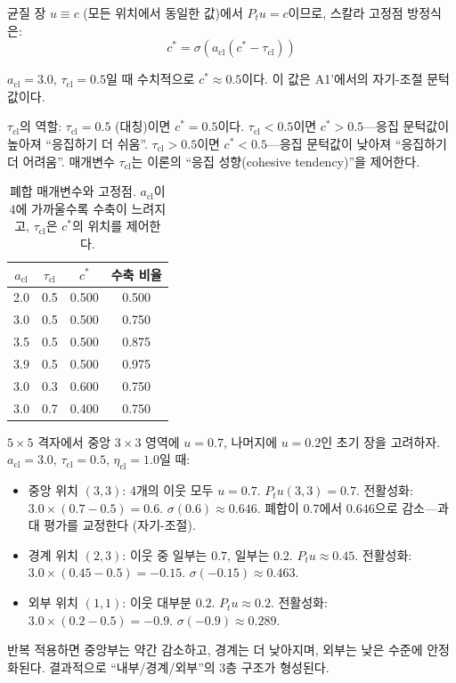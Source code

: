 균질 장 $u \equiv c$ (모든 위치에서 동일한 값)에서 $P_t u = c$이므로, 스칼라 고정점 방정식은:
\begin{equation}
    c^* = \sigma(a_{\mathrm{cl}}(c^* - \tau_{\mathrm{cl}}))
    \label{eq:scalar-fixed-point}
\end{equation}

$a_{\mathrm{cl}} = 3.0$, $\tau_{\mathrm{cl}} = 0.5$일 때 수치적으로 $c^* \approx 0.5$이다. 이 값은 A1'에서의 자기-조절 문턱값이다.

$\tau_{\mathrm{cl}}$의 역할: $\tau_{\mathrm{cl}} = 0.5$ (대칭)이면 $c^* = 0.5$이다. $\tau_{\mathrm{cl}} < 0.5$이면 $c^* > 0.5$---응집 문턱값이 높아져 ``응집하기 더 쉬움''. $\tau_{\mathrm{cl}} > 0.5$이면 $c^* < 0.5$---응집 문턱값이 낮아져 ``응집하기 더 어려움''. 매개변수 $\tau_{\mathrm{cl}}$는 이론의 ``응집 성향(cohesive tendency)''을 제어한다.

\begin{table}[h]
\centering
\begin{tabular}{cccc}
\hline
$a_{\mathrm{cl}}$ & $\tau_{\mathrm{cl}}$ & $c^*$ & 수축 비율 \\
\hline
2.0 & 0.5 & 0.500 & 0.500 \\
3.0 & 0.5 & 0.500 & 0.750 \\
3.5 & 0.5 & 0.500 & 0.875 \\
3.9 & 0.5 & 0.500 & 0.975 \\
3.0 & 0.3 & 0.600 & 0.750 \\
3.0 & 0.7 & 0.400 & 0.750 \\
\hline
\end{tabular}
\caption{폐합 매개변수와 고정점. $a_{\mathrm{cl}}$이 4에 가까울수록 수축이 느려지고, $\tau_{\mathrm{cl}}$은 $c^*$의 위치를 제어한다.}
\label{tab:closure-parameters}
\end{table}

\begin{example}
$5 \times 5$ 격자에서 중앙 $3 \times 3$ 영역에 $u = 0.7$, 나머지에 $u = 0.2$인 초기 장을 고려하자. $a_{\mathrm{cl}} = 3.0$, $\tau_{\mathrm{cl}} = 0.5$, $\eta_{\mathrm{cl}} = 1.0$일 때:

\begin{itemize}
    \item 중앙 위치 $(3,3)$: 4개의 이웃 모두 $u = 0.7$. $P_t u(3,3) = 0.7$. 전활성화: $3.0 \times (0.7 - 0.5) = 0.6$. $\sigma(0.6) \approx 0.646$. 폐합이 $0.7$에서 $0.646$으로 감소---과대 평가를 교정한다 (자기-조절).
    \item 경계 위치 $(2,3)$: 이웃 중 일부는 $0.7$, 일부는 $0.2$. $P_t u \approx 0.45$. 전활성화: $3.0 \times (0.45 - 0.5) = -0.15$. $\sigma(-0.15) \approx 0.463$.
    \item 외부 위치 $(1,1)$: 이웃 대부분 $0.2$. $P_t u \approx 0.2$. 전활성화: $3.0 \times (0.2 - 0.5) = -0.9$. $\sigma(-0.9) \approx 0.289$.
\end{itemize}
반복 적용하면 중앙부는 약간 감소하고, 경계는 더 낮아지며, 외부는 낮은 수준에 안정화된다. 결과적으로 ``내부/경계/외부''의 3층 구조가 형성된다.
\end{example}


